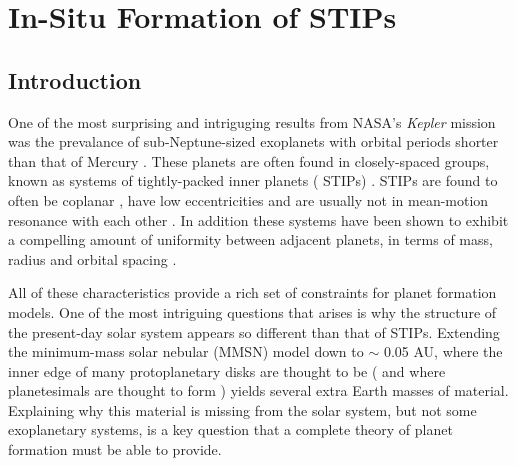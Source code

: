 \chapter {In-Situ Formation of STIPs}

\section{Introduction} \label{sec:intro}

One of the most surprising and intriguging results from NASA's \textit{Kepler} mission was the prevalance 
of sub-Neptune-sized exoplanets with orbital periods shorter than that of Mercury \cite{borucki10}. These 
planets are often found in closely-spaced groups, known as systems of tightly-packed inner planets (
STIPs) \cite{latham11, lissauer11, lissauer14}. STIPs are found to often be coplanar 
\cite{fang12, tremaine12}, have low eccentricities \cite{vaneylen15, hadden17} and are usually not in 
mean-motion resonance with each other \cite{fabrycky14, steffen15}. In addition these systems have been 
shown to exhibit a compelling amount of uniformity between adjacent planets, in terms of mass, radius and 
orbital spacing \cite{millholland17, millholland21}.

All of these characteristics provide a rich set of constraints for planet formation models. One of the 
most intriguing questions that arises is why the structure of the present-day solar system appears so 
different than that of STIPs. Extending the minimum-mass solar nebular (MMSN) model \cite{hayashi81} down 
to $\sim$ 0.05 AU, where the inner edge of many protoplanetary disks are thought to be \cite{meyer97} (
and where planetesimals are thought to form \cite{mulders18}) yields several extra Earth masses of 
material. Explaining why this material is missing from the solar system, but not some exoplanetary 
systems, is a key question that a complete theory of planet formation must be able to provide.


